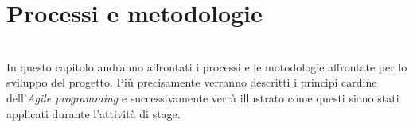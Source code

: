 
\chapter{Processi e metodologie}
\label{cap:processi-metodologie}
\\
In questo capitolo andranno affrontati i processi e le motodologie affrontate per lo sviluppo del progetto. Più precisamente verranno descritti i principi cardine dell’\textit{Agile programming}
e successivamente verrà illustrato come questi siano stati applicati durante l'attività di stage.\\

